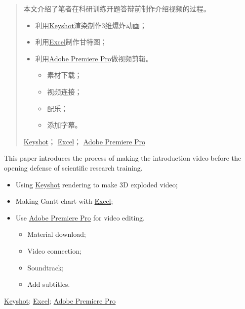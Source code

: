 \documentclass[../main]{subfiles}
\begin{document}
\begin{abstract}
  本文介绍了笔者在科研训练开题答辩前制作介绍视频的过程。

  \begin{itemize}
    \item 利用\href{https://www.keyshot.com/}{Keyshot}渲染制作3维爆炸动画；
    \item 利用\href{https://www.microsoft.com/en-us/microsoft-365/excel}{Excel}制作甘特图；
    \item 利用\href{https://www.adobe.com/products/premiere.html}{Adobe Premiere Pro}做视频剪辑。
      \begin{itemize}
        \item 素材下载；
        \item 视频连接；
        \item 配乐；
        \item 添加字幕。
      \end{itemize}
  \end{itemize}
  \begin{keyword}
    \href{https://www.keyshot.com/}{Keyshot}；
    \href{https://www.microsoft.com/en-us/microsoft-365/excel}{Excel}；
    \href{https://www.adobe.com/products/premiere.html}{Adobe Premiere Pro}
  \end{keyword}
\end{abstract}

\begin{abstract*}
  This paper introduces the process of making the introduction video before the opening defense of scientific research training.

  \begin{itemize}
    \item Using \href{https://www.keyshot.com/}{Keyshot} rendering to make 3D exploded video;
    \item Making Gantt chart with \href{https://www.microsoft.com/en-us/microsoft-365/excel}{Excel};
    \item Use \href{https://www.adobe.com/products/premiere.html}{Adobe Premiere Pro} for video editing.
      \begin{itemize}
        \item Material download;
        \item Video connection;
        \item Soundtrack;
        \item Add subtitles.
      \end{itemize}
  \end{itemize}
  \begin{keyword*}
    \href{https://www.keyshot.com/}{Keyshot};
    \href{https://www.microsoft.com/en-us/microsoft-365/excel}{Excel};
    \href{https://www.adobe.com/products/premiere.html}{Adobe Premiere Pro}
  \end{keyword*}
\end{abstract*}
\end{document}
